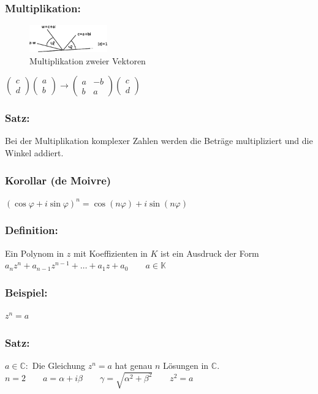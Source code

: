 \subsubsection{Multiplikation:}
\begin{figure}[H]
\centering
\includegraphics[width=0.3\textwidth]{mainmatter/chapter3/pics/multiplikation.png}
\caption{Multiplikation zweier Vektoren}
\end{figure}
$\begin{pmatrix} c \\ d \end{pmatrix}\begin{pmatrix}a \\ b \end{pmatrix} \rightarrow \begin{pmatrix}a & -b \\ b & a \end{pmatrix}\begin{pmatrix}c \\ d\end{pmatrix}$
%
%
%
\subsubsection{Satz:}
Bei der Multiplikation komplexer Zahlen werden die Beträge multipliziert und die Winkel addiert.
%
%
%
\subsubsection{Korollar (de Moivre)}
$(\cos\varphi + i\sin\varphi)^{n}=\cos(n\varphi)+i\sin(n\varphi)$
%
%
%
\subsubsection{Definition:}
Ein Polynom in $z$ mit Koeffizienten in $K$ ist ein Ausdruck der Form $a_{n}z^{n}+a_{n-1}z^{n-1}+\dotsc +a_{1}z+a_{0} \qquad a \in \mathbb{K}$
%
%
%
\subsubsection{Beispiel:}
$z^{n}=a$
%
%
% 
\subsubsection{Satz:}
$a\in \mathbb{C}:$ Die Gleichung $z^{n}=a$ hat genau $n$ Lösungen in $\mathbb{C}$.\\
$n=2 \qquad a=\alpha+i\beta \qquad \gamma=\sqrt{\alpha^{2} + \beta^{2}} \qquad z^{2}=a$
%
%
%
